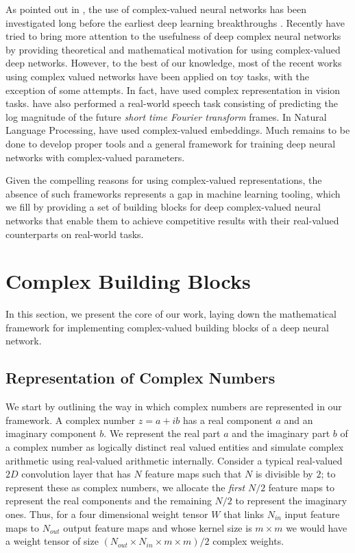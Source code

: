 \documentclass{article}
\begin{document}
As pointed out in \citet{reichert2013neuronal}, the use of complex-valued neural networks \citep{georgiou1992complex,zemel1995lending,kim2003approximation,hirose2003complex,nitta2004orthogonality} has been investigated long before the earliest deep learning breakthroughs \citep{hinton2006fast,bengio2007greedy,poultney2007efficient}. Recently \cite{reichert2013neuronal,bruna2015mathematical,arjovsky2015unitary,danihelka2016associative,wisdom2016full} have tried to bring more attention to the usefulness of deep complex neural networks by providing theoretical and mathematical motivation for using complex-valued deep networks. However, to the best of our knowledge, most of the recent works using complex valued networks have been applied on toy tasks, with the exception of some attempts. In fact, \citep{oyallon2015deep,tygert2015scale,worrall2016harmonic} have used complex representation in vision tasks. \cite{wisdom2016full} have also performed a real-world speech task consisting of predicting the log magnitude of the future \emph{short time Fourier transform} frames. In Natural Language Processing, \citep{trouillon2016complex,trouillon2017complex} have used complex-valued embeddings. Much remains to be done to develop proper tools and a general framework for training deep neural networks with complex-valued parameters.

Given the compelling reasons for using complex-valued representations, the absence of such frameworks represents a gap in machine learning tooling, which we fill by providing a set of building blocks for deep complex-valued neural networks that enable them to achieve competitive results with their real-valued counterparts on real-world tasks.

\section{Complex Building Blocks}
In this section, we present the core of our work, laying down the mathematical framework for implementing complex-valued building blocks of a deep neural network.

\subsection{Representation of Complex Numbers}
We start by outlining the way in which complex numbers are represented in our framework. A complex number $z = a + ib$ has a real component $a$ and an imaginary component $b$. We represent the real part $a$ and the imaginary part $b$ of a complex number as logically distinct real valued entities and simulate complex arithmetic using real-valued arithmetic internally. Consider a typical real-valued $2D$ convolution layer that has $N$ feature maps such that $N$ is divisible by $2$; to represent these as complex numbers, we allocate the \textit{first} $N/2$ feature maps to represent the real components and the remaining $N/2$ to represent the imaginary ones. Thus, for a four dimensional weight tensor $W$ that links $N_{in}$ input feature maps to $N_{out}$ output feature maps and whose kernel size is $m\times m$ we would have a weight tensor of size $\left (N_{out}\times N_{in}\times m\times m \right)/2$ complex weights.
\end{document}
